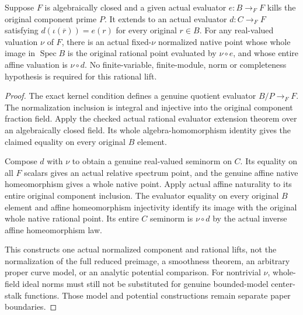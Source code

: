 \begin{theorem}
\label{scheme:normalized-component-rational-native-lift}
\leanok
{}
Suppose $F$ is algebraically closed and a given actual evaluator
$e:B\to_F F$ kills the original component prime $P$. It extends to an
actual evaluator $d:C\to_F F$ satisfying
$d(\iota(\overline r))=e(r)$ for every original $r\in B$.
For any real-valued valuation $\nu$ of $F$, there is an actual
fixed-$\nu$ normalized native point whose whole image in
$\operatorname{Spec}B$ is the original rational point evaluated by
$\nu\circ e$, and whose entire affine valuation is $\nu\circ d$.
No finite-variable, finite-module, norm or completeness hypothesis is
required for this rational lift.
\end{theorem}
\begin{proof}
The exact kernel condition defines a genuine quotient evaluator
$B/P\to_F F$. The normalization inclusion is integral and injective into
the original component fraction field. Apply the checked actual rational
evaluator extension theorem over an algebraically closed field. Its
whole algebra-homomorphism identity gives the claimed equality on every
original $B$ element.

Compose $d$ with $\nu$ to obtain a genuine real-valued seminorm on $C$.
Its equality on all $F$ scalars gives an actual relative spectrum point,
and the genuine affine native homeomorphism gives a whole native point.
Apply actual affine naturality to its entire original component inclusion.
The evaluator equality on every original $B$ element and affine
homeomorphism injectivity identify its image with the original whole
native rational point. Its entire $C$ seminorm is $\nu\circ d$ by the
actual inverse affine homeomorphism law.

This constructs one actual normalized component and rational lifts, not
the normalization of the full reduced preimage, a smoothness theorem,
an arbitrary proper curve model, or an analytic potential comparison.
For nontrivial $\nu$, whole-field ideal norms must still not be substituted
for genuine bounded-model center-stalk functions. Those model and
potential constructions remain separate paper boundaries.
\end{proof}
